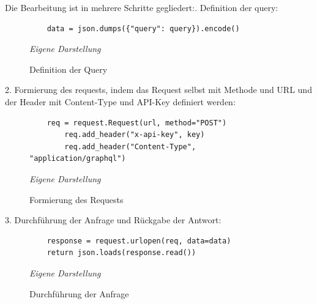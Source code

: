 Die Bearbeitung ist in mehrere Schritte gegliedert:. Definition der query:\newline
	\begin{figure}[H]
	\centering
	\begin{minipage}[t]{.7\textwidth} %
	\caption{Definition der Query} %
	\begin{verbatim}
	data = json.dumps({"query": query}).encode()
	\end{verbatim}
	
	\textit{Eigene Darstellung} %
	\label{fig:queryDefinition}
	\end{minipage}
	\end{figure}
2. Formierung des requests, indem das Request selbst mit Methode und URL und der Header mit Content-Type und API-Key definiert werden:\newline
	\begin{figure}[H]
	\centering
	\begin{minipage}[t]{.7\textwidth} %
	\caption{Formierung des Requests} %
	\begin{verbatim}
	req = request.Request(url, method="POST")
	    req.add_header("x-api-key", key)
	    req.add_header("Content-Type", "application/graphql")
	\end{verbatim}
	
	\textit{Eigene Darstellung} %
	\label{fig:requestFormierung}
	\end{minipage}
	\end{figure}
3. Durchführung der Anfrage und Rückgabe der Antwort:\newline
	\begin{figure}[H]
	\centering
	\begin{minipage}[t]{.7\textwidth} %
	\caption{Durchführung der Anfrage} %
	\begin{verbatim}
	response = request.urlopen(req, data=data)
	return json.loads(response.read())
	\end{verbatim}
	
	\textit{Eigene Darstellung} %
	\label{fig:anfrageDurchführung}
	\end{minipage}
	\end{figure}
